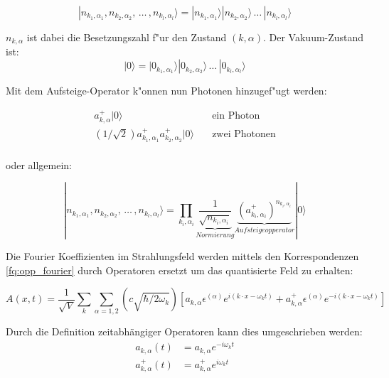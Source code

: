 \begin{equation}
|n_{k_1,\alpha_1}, n_{k_2,\alpha_2}, \, \hdots \, , n_{k_l,\alpha_l}\rangle = |n_{k_1,\alpha_1}\rangle |n_{k_2,\alpha_2}\rangle \, \hdots \, |n_{k_l,\alpha_l}\rangle
\end{equation}

$n_{k,\alpha}$ ist dabei die Besetzungszahl f"ur den Zustand $(k,\alpha)$. Der Vakuum-Zustand ist:
\begin{equation}
|0\rangle = |0_{k_1,\alpha_1}\rangle |0_{k_2,\alpha_2}\rangle \, \hdots \, |0_{k_l,\alpha_l}\rangle
\end{equation}

Mit dem Aufsteige-Operator k"onnen nun Photonen hinzugef"ugt werden:

\begin{equation}
\begin{split}
a^+_{k,\alpha}|0\rangle & \quad \text{ein Photon}\\
\left(1/\sqrt{2}\right)a^+_{k_1,\alpha_1}a^+_{k_2,\alpha_2}|0\rangle & \quad \text{zwei Photonen}\\
\end{split}
\end{equation}

oder allgemein:

\begin{equation}
|n_{k_1,\alpha_1}, n_{k_2,\alpha_2}, \, \hdots \, , n_{k_l,\alpha_l}\rangle =
 \prod_{k_i,\alpha_i}\underbrace{\frac{1}{\sqrt{n_{k_i,\alpha_i}}}}_{Normierung} \underbrace{(a^+_{k_i,\alpha_i})^{n_{k_i,\alpha_i}}}_{Aufsteigeopperator} |0\rangle
\end{equation}

Die Fourier Koeffizienten im Strahlungsfeld werden mittels den Korrespondenzen \ref{fq:opp_fourier} durch Operatoren ersetzt um das quantisierte Feld zu erhalten:

\begin{equation}
A(x,t) = \frac{1}{\sqrt{V}} \sum_k \sum_{\alpha=1,2} \left(c \sqrt{\hbar/2 \omega_k}\right)\left[a_{k,\alpha} \epsilon^{(\alpha)} e^{i (k \cdot x - \omega_k t)} + a^+_{k,\alpha} \epsilon^{(\alpha)} e^{-i (k \cdot x - \omega_k t)}\right]
\end{equation}

Durch die Definition zeitabhängiger Operatoren kann dies umgeschrieben werden:
\begin{equation}
\begin{split}
a_{k,\alpha}(t) &= a_{k,\alpha} e^{-i \omega_k t} \\
a^+_{k,\alpha}(t) &= a^+_{k,\alpha} e^{i \omega_k t}
\end{split}
\end{equation}

